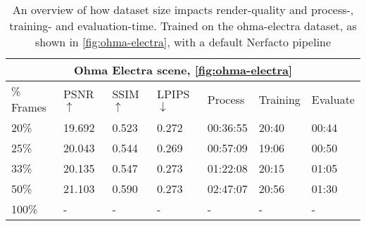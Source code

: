 \begin{comment}
\begin{table}[h]
\centering
\begin{tabular}{ccccccc}
\hline
\# Samples & PSNR $\uparrow$ & SSIM $\uparrow$ & LPIPS $\downarrow$ & Process Time & Training Time & Evaluate Time \\ \hline
5\%                       & 17.955    & 0.458     & 0.338    & 02:37    & 29:03    & 00:19    \\
10\%                      & 19.422    & 0.505     & 0.280    & 06:10    & 28:31    & 00:24    \\
15\%                      & 19.841    & 0.537     & 0.268    & 12:50    & 28:39    & 00:32    \\
20\%                      & 20.341    & 0.555     & 0.269    & 18:17    & 28:24    & 00:35    \\
25\%                      & 20.118    & 0.548     & 0.263    & 30:05    & 49:08    & 01:15    \\
40\%                      & 22.371    & 0.649     & 0.258    & 58:01    & 28:50    & 01:13    \\
50\%                      & 21.738    & 0.623     & 0.263    & -    & -    & -    \\
75\%                      & -    & -     & -    & -    & -    & -    \\
\multicolumn{1}{l}{100\%} & -    & -     & -    & -    & -    & -    \\ \hline
\end{tabular}
\caption{An overview of how dataset size impacts render-quality and process-, training- and evaluation-time. Trained on \autoref{fig:ohma-electra} with a vanilla Nerfacto pipeline}
\label{tab:colmap-dataset-size}
\end{table}
\end{comment}

\begin{table}[h]
\centering
\begin{tabular}{|l|llllll|}
\hline
\multicolumn{7}{|c|}{\textbf{Ohma Electra scene, \autoref{fig:ohma-electra}}} \\
\hline
\% Frames & PSNR $\uparrow$ & SSIM $\uparrow$ & LPIPS $\downarrow$ & Process & Training & Evaluate \\ \hline
20\%        & 19.692    & 0.523     & 0.272    & 00:36:55    & 20:40    & 00:44    \\
25\%        & 20.043    & 0.544     & 0.269    & 00:57:09    & 19:06    & 00:50    \\
33\%        & 20.135    & 0.547     & 0.273    & 01:22:08    & 20:15    & 01:05    \\
50\%        & 21.103    & 0.590     & 0.273    & 02:47:07    & 20:56    & 01:30    \\
100\%       & -    & -     & -    & -    & -    & -    \\
\hline
\end{tabular}
\caption{An overview of how dataset size impacts render-quality and process-, training- and evaluation-time. Trained on the ohma-electra dataset, as shown in \autoref{fig:ohma-electra}, with a default Nerfacto pipeline}
\label{tab:colmap-dataset-size}
\end{table}
